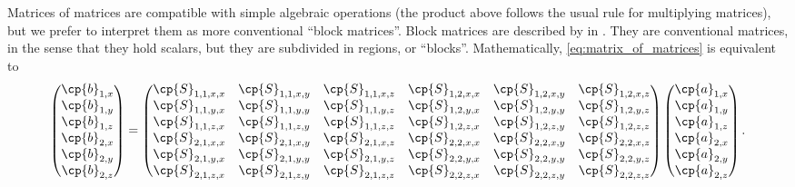 Matrices of matrices are compatible with simple algebraic operations (the product above follows the usual rule for multiplying matrices), but we prefer to interpret them as more conventional ``block matrices''.
Block matrices are described by \citeauthor{eves2012elementary} in  \cite{eves2012elementary}.
They are conventional matrices, in the sense that they hold scalars, but they are subdivided in regions, or ``blocks''.
Mathematically, \cref{eq:matrix_of_matrices} is equivalent to
\begin{equation}
    \begin{pmatrix}
        \cp{b}_{1, x} \\ \cp{b}_{1, y} \\ \cp{b}_{1, z}
        \\
        \cp{b}_{2, x} \\ \cp{b}_{2, y} \\ \cp{b}_{2, z}
    \end{pmatrix}
    =
    \begin{pmatrix}
        \cp{S}_{1, 1, x, x} & \cp{S}_{1, 1, x, y} & \cp{S}_{1, 1, x, z}   &   \cp{S}_{1, 2, x, x} & \cp{S}_{1, 2, x, y} & \cp{S}_{1, 2, x, z} \\
        \cp{S}_{1, 1, y, x} & \cp{S}_{1, 1, y, y} & \cp{S}_{1, 1, y, z}   &   \cp{S}_{1, 2, y, x} & \cp{S}_{1, 2, y, y} & \cp{S}_{1, 2, y, z} \\
        \cp{S}_{1, 1, z, x} & \cp{S}_{1, 1, z, y} & \cp{S}_{1, 1, z, z}   &   \cp{S}_{1, 2, z, x} & \cp{S}_{1, 2, z, y} & \cp{S}_{1, 2, z, z} \\
        \cp{S}_{2, 1, x, x} & \cp{S}_{2, 1, x, y} & \cp{S}_{2, 1, x, z}   &   \cp{S}_{2, 2, x, x} & \cp{S}_{2, 2, x, y} & \cp{S}_{2, 2, x, z} \\
        \cp{S}_{2, 1, y, x} & \cp{S}_{2, 1, y, y} & \cp{S}_{2, 1, y, z}   &   \cp{S}_{2, 2, y, x} & \cp{S}_{2, 2, y, y} & \cp{S}_{2, 2, y, z} \\
        \cp{S}_{2, 1, z, x} & \cp{S}_{2, 1, z, y} & \cp{S}_{2, 1, z, z}   &   \cp{S}_{2, 2, z, x} & \cp{S}_{2, 2, z, y} & \cp{S}_{2, 2, z, z}
    \end{pmatrix}
    \begin{pmatrix}
        \cp{a}_{1, x} \\ \cp{a}_{1, y} \\ \cp{a}_{1, z}
        \\
        \cp{a}_{2, x} \\ \cp{a}_{2, y} \\ \cp{a}_{2, z}
    \end{pmatrix}
    \text{.}
    \label{eq:matrix_flattenned}
\end{equation}
